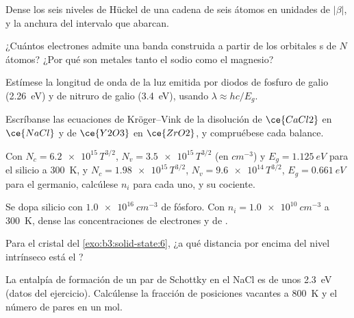 \begin{exercise}[$\star$]\label{exo:b3:solid-state:1}
Dense los seis niveles de Hückel de una cadena de seis átomos en unidades de $|\beta|$, y la
anchura del intervalo que abarcan.
\end{exercise}

\begin{exercise}[$\star$]\label{exo:b3:solid-state:2}
¿Cuántos electrones admite una banda construida a partir de los orbitales s de $N$ átomos? ¿Por qué
son metales tanto el sodio como el magnesio?
\end{exercise}

\begin{exercise}[$\star$]\label{exo:b3:solid-state:3}
Estímese la longitud de onda de la luz emitida por diodos de fosfuro de galio
(\qty{2.26}{eV}) y de nitruro de galio (\qty{3.4}{eV}), usando $\lambda \approx hc/E_g$.
\end{exercise}

\begin{exercise}[$\star$]\label{exo:b3:solid-state:4}
Escríbanse las ecuaciones de Kröger--Vink de la disolución de $\ce{CaCl2}$ en $\ce{NaCl}$ y de $\ce{Y2O3}$ en $\ce{ZrO2}$, y
compruébese cada balance.
\end{exercise}

\begin{exercise}[$\star\star$]\label{exo:b3:solid-state:5}
Con $N_c = \num{6.2e15}\,T^{3/2}$, $N_v = \num{3.5e15}\,T^{3/2}$ (en $\unit{cm^{-3}}$) y $E_g = \qty{1.125}{eV}$ para el silicio a \qty{300}{K},
y $N_c = \num{1.98e15}\,T^{3/2}$, $N_v = \num{9.6e14}\,T^{3/2}$, $E_g = \qty{0.661}{eV}$ para el germanio, calcúlese $n_i$ para cada uno, y su
cociente.
\end{exercise}

\begin{exercise}[$\star\star$]\label{exo:b3:solid-state:6}
Se dopa silicio con $\qty{1.0e16}{cm^{-3}}$ de fósforo. Con $n_i = \qty{1.0e10}{cm^{-3}}$ a \qty{300}{K}, dense las
concentraciones de electrones y de .
\end{exercise}

\begin{exercise}[$\star\star$]\label{exo:b3:solid-state:7}
Para el cristal del \cref{exo:b3:solid-state:6}, ¿a qué distancia por encima del nivel intrínseco está
el ?
\end{exercise}

\begin{exercise}[$\star\star$]\label{exo:b3:solid-state:8}
La entalpía de formación de un par de Schottky en el NaCl es de unos \qty{2.3}{eV} (datos del
ejercicio). Calcúlense la fracción de posiciones vacantes a \qty{800}{K} y el número de
pares en un mol.
\end{exercise}


